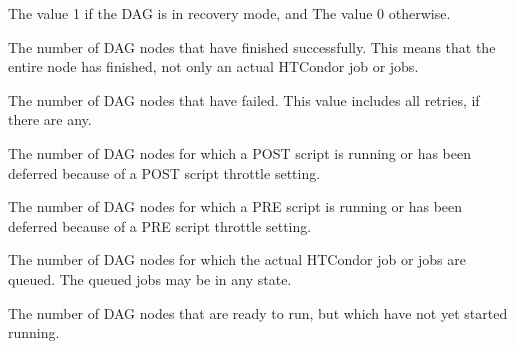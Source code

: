 \begin {description}

\label{AttrDAGInRecovery}
\item[\AdAttr{DAG\_InRecovery}:]   
The value 1 if the DAG is in recovery mode, and
The value 0 otherwise. 

\label{AttrDAGNodesDone}
\item[\AdAttr{DAG\_NodesDone}:]   
The number of DAG nodes that have finished successfully.
This means that the entire node has finished, 
not only an actual HTCondor job or jobs.

\label{AttrDAGNodesFailed}
\item[\AdAttr{DAG\_NodesFailed}:]
The number of DAG nodes that have failed.
This value includes all retries, if there are any.

\label{AttrDAGNodesPostrun}
\item[\AdAttr{DAG\_NodesPostrun}:]
The number of DAG nodes for which a POST script is running 
or has been deferred because of a POST script throttle setting. 

\label{AttrDAGNodesPrerun}
\item[\AdAttr{DAG\_NodesPrerun}:]
The number of DAG nodes for which a PRE script is running 
or has been deferred because of a PRE script throttle setting. 

\label{AttrDAGNodesQueued}
\item[\AdAttr{DAG\_NodesQueued}:]
The number of DAG nodes for which the actual HTCondor job or jobs 
are queued.
The queued jobs may be in any state.

\label{AttrDAGNodesReady}
\item[\AdAttr{DAG\_NodesReady}:]
The number of DAG nodes that are ready to run,
but which have not yet started running.


\end{description}
